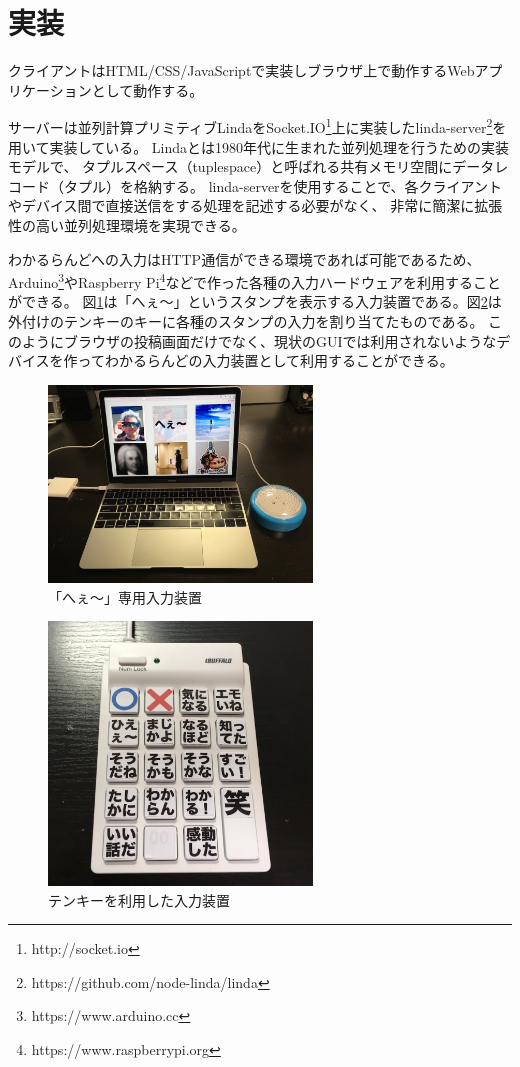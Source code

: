 \section{実装}

クライアントはHTML/CSS/JavaScriptで実装しブラウザ上で動作するWebアプリケーションとして動作する。

サーバーは並列計算プリミティブLindaをSocket.IO\footnote{http://socket.io}上に実装したlinda-server\footnote{https://github.com/node-linda/linda}を用いて実装している。
Lindaとは1980年代に生まれた並列処理を行うための実装モデルで、
タプルスペース（tuplespace）と呼ばれる共有メモリ空間にデータレコード（タプル）を格納する。
linda-serverを使用することで、各クライアントやデバイス間で直接送信をする処理を記述する必要がなく、
非常に簡潔に拡張性の高い並列処理環境を実現できる。

わかるらんどへの入力はHTTP通信ができる環境であれば可能であるため、
Arduino\footnote{https://www.arduino.cc}やRaspberry Pi\footnote{https://www.raspberrypi.org}などで作った各種の入力ハードウェアを利用することができる。
図\ref{button}は「へぇ〜」というスタンプを表示する入力装置である。図\ref{10key}は外付けのテンキーのキーに各種のスタンプの入力を割り当てたものである。
このようにブラウザの投稿画面だけでなく、現状のGUIでは利用されないようなデバイスを作ってわかるらんどの入力装置として利用することができる。

\begin{figure}[h]
\centering
\includegraphics[width=7cm]{images/button.eps}
\caption{「へぇ〜」専用入力装置}
\label{button}
\end{figure}

\begin{figure}[h]
\centering
\includegraphics[width=7cm]{images/10key.eps}
\caption{テンキーを利用した入力装置}
\label{10key}
\end{figure}